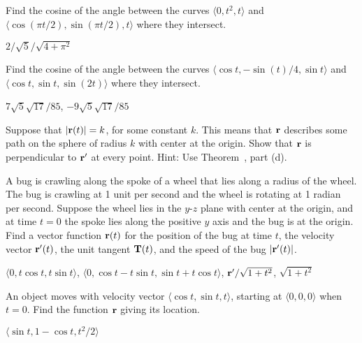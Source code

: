 \begin{theorem}
\begin{exercises}
\begin{exercise} Find the cosine of the angle between the curves $\langle
0,t^2,t\rangle$ and $\langle \cos(\pi t/2),\sin(\pi t/2), t\rangle$
where they intersect.
\begin{answer} $2/\sqrt5/\sqrt{4+\pi^2}$
\end{answer}\end{exercise}

\begin{exercise} Find the cosine of the angle between the curves $\langle
\cos t,-\sin(t)/4,\sin t\rangle$ and $\langle \cos t,\sin t, \sin(2t)\rangle$
where they intersect.
\begin{answer} $7\sqrt{5}\sqrt{17}/85$, $-9\sqrt{5}\sqrt{17}/85$
\end{answer}\end{exercise}

\begin{exercise} Suppose that $|{\bf r}(t)|=k$, for some constant $k$. This
means that $\bf r$ describes some path on the sphere of radius $k$
with center at the origin. Show that $\bf r$ is perpendicular to ${\bf
  r}'$ at every point. Hint: Use Theorem~, part (d).
\label{exercise:derivative is perpendicular}

\begin{exercise} A bug is crawling along the spoke of a wheel that lies along
a radius of the wheel. The bug is crawling at 1 unit per second and
the wheel is rotating at 1 radian per second. Suppose the wheel lies
in the $y$-$z$ plane with center at the origin, and at time $t=0$ the
spoke lies along the positive $y$ axis and the bug is at the origin. 
Find a vector function ${\bf r}(t)$
for the position of the bug at time $t$, the velocity vector
${\bf r}'(t)$, the unit tangent ${\bf T}(t)$, and the speed of the bug
$|{\bf r}'(t)|$.
\begin{answer} $\langle 0,t\cos t,t\sin t\rangle$, 
$\langle 0,\cos t-t\sin t,\sin t+t\cos t\rangle$,
${\bf r}'/\sqrt{1+t^2}$, $\sqrt{1+t^2}$
\end{answer}\end{exercise}

\begin{exercise} An object moves with velocity vector $\langle \cos t, \sin t,
t\rangle$, starting at $\langle 0,0,0\rangle$ when $t=0$. Find the function
${\bf r}$ giving its location.
\begin{answer} $\langle \sin t,1-\cos t,t^2/2\rangle$
\end{answer}\end{exercise}



\end{exercise}
\end{exercises}
\end{theorem}
